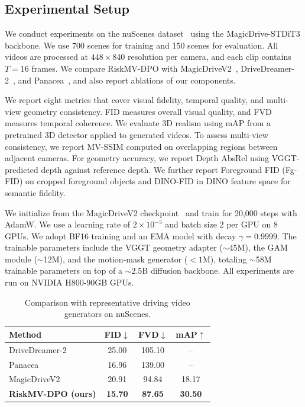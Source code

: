\documentclass{article}
\begin{document}
\subsection{Experimental Setup}
\label{subsec:exp_setup}

We conduct experiments on the nuScenes dataset~\cite{caesar2020nuscenes} using the MagicDrive-STDiT3 backbone.
We use 700 scenes for training and 150 scenes for evaluation.
All videos are processed at $448\times 840$ resolution per camera, and each clip contains $T{=}16$ frames.
We compare RiskMV-DPO with MagicDriveV2~\cite{gao2025magicdrivev2}, DriveDreamer-2~\cite{zhao2024drivedreamer2}, and Panacea~\cite{wen2024panacea}, and also report ablations of our components.


We report eight metrics that cover visual fidelity, temporal quality, and multi-view geometry consistency.
FID measures overall visual quality, and FVD measures temporal coherence.
We evaluate 3D realism using mAP from a pretrained 3D detector applied to generated videos.
To assess multi-view consistency, we report MV-SSIM computed on overlapping regions between adjacent cameras.
For geometry accuracy, we report Depth AbsRel using VGGT-predicted depth against reference depth.
We further report Foreground FID (Fg-FID) on cropped foreground objects and DINO-FID in DINO feature space for semantic fidelity.

We initialize from the MagicDriveV2 checkpoint~\cite{gao2025magicdrivev2} and train for 20{,}000 steps with AdamW.
We use a learning rate of $2\times 10^{-5}$ and batch size 2 per GPU on 8 GPUs.
We adopt BF16 training and an EMA model with decay $\gamma{=}0.9999$.
The trainable parameters include the VGGT geometry adapter ($\sim$45M), the GAM module ($\sim$12M), and the motion-mask generator ($<1$M), totaling $\sim$58M trainable parameters on top of a $\sim$2.5B diffusion backbone.
All experiments are run on NVIDIA H800-90GB GPUs. 

\begin{table}[t]
\centering
\small
\setlength{\tabcolsep}{5pt}
\begin{tabular}{lccc}
\toprule
Method & FID$\downarrow$ & FVD$\downarrow$ & mAP$\uparrow$ \\
\midrule
DriveDreamer-2 & 25.00 & 105.10 & -- \\
Panacea & 16.96 & 139.00 & -- \\
MagicDriveV2 & 20.91 & 94.84 & 18.17 \\
\textbf{RiskMV-DPO (ours)} & \textbf{15.70} & \textbf{87.65} & \textbf{30.50} \\
\bottomrule
\end{tabular}
\caption{Comparison with representative driving video generators on nuScenes.}
\label{tab:main_results}
\end{table}
\end{document}
